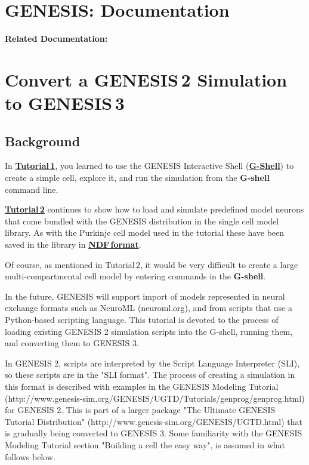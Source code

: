 \documentclass[12pt]{article}
\begin{document}
\section*{GENESIS: Documentation}

{\bf Related Documentation:}

\section*{Convert a GENESIS\,2 Simulation to GENESIS\,3}

\subsection*{Background}

In \href{../tutorial1/tutorial1.tex}{\bf Tutorial\,1}, you learned to use the GENESIS Interactive Shell (\href{../gshell/gshell.tex}{\bf G-Shell})
to create a simple cell, explore it, and run the simulation from the
{\bf G-shell} command line.

\href{../tutorial2/tutorial2.tex}{\bf Tutorial\,2} continues to show how to load and simulate predefined model
neurons that come bundled with the GENESIS distribution in the single
cell model library.  As with the Purkinje cell model used in the
tutorial these have been saved in the library in \href{../ndf-file-format/ndf-file-format.tex}{\bf NDF\,format}.

Of course, as mentioned in Tutorial\,2, it would be very difficult to create a large multi-compartmental
cell model by entering commands in the {\bf G-shell}.

In the future, GENESIS will support import of models represented in
neural exchange formats such as NeuroML (neuroml.org), and from scripts
that use a Python-based scripting language.  This tutorial is devoted
to the process of loading existing GENESIS 2 simulation scripts into
the G-shell, running them, and converting them to GENESIS 3.

In GENESIS 2, scripts are interpreted by the Script Language
Interpreter (SLI), so these scripts are in the "SLI format".  The
process of creating a simulation in this format is described with
examples in the GENESIS Modeling Tutorial
(http://www.genesis-sim.org/GENESIS/UGTD/Tutorials/genprog/genprog.html)
for GENESIS 2.  This is part of a larger package "The Ultimate GENESIS
Tutorial Distribution" (http://www.genesis-sim.org/GENESIS/UGTD.html)
that is gradually being converted to GENESIS 3.  Some familiarity with
the GENESIS Modeling Tutorial section "Building a cell the easy way",
is assumed in what follows below.
\end{document}
